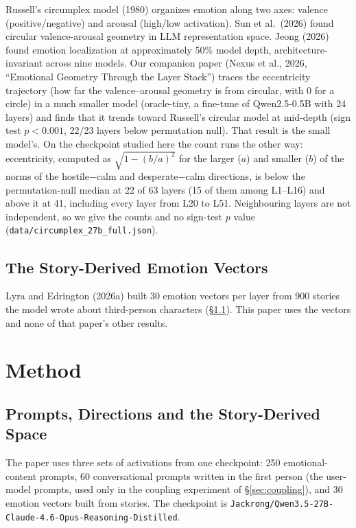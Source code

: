 \documentclass[11pt,a4paper]{article}
\begin{document}
Russell's circumplex model (1980) organizes emotion along two axes: valence (positive/negative) and arousal (high/low activation). Sun et al.\ (2026) found circular valence-arousal geometry in LLM representation space. Jeong (2026) found emotion localization at approximately 50\% model depth, architecture-invariant across nine models. Our companion paper (Nexus et al., 2026, ``Emotional Geometry Through the Layer Stack'') traces the eccentricity trajectory (how far the valence--arousal geometry is from circular, with 0 for a circle) in a much smaller model (oracle-tiny, a fine-tune of Qwen2.5-0.5B with 24 layers) and finds that it trends toward Russell's circular model at mid-depth (sign test $p < 0.001$, 22/23 layers below permutation null). That result is the small model's. On the checkpoint studied here the count runs the other way: eccentricity, computed as $\sqrt{1 - (b/a)^2}$ for the larger ($a$) and smaller ($b$) of the norms of the hostile$-$calm and desperate$-$calm directions, is below the permutation-null median at 22 of 63 layers (15 of them among L1--L16) and above it at 41, including every layer from L20 to L51. Neighbouring layers are not independent, so we give the counts and no sign-test $p$ value (\texttt{data/\allowbreak circumplex\_27b\_full.json}).

\subsection{The Story-Derived Emotion Vectors}
\label{sec:user-model}

Lyra and Edrington (2026a) built 30 emotion vectors per layer from 900 stories the model wrote about third-person characters (\S\ref{sec:shared-subspace}). This paper uses the vectors and none of that paper's other results.

\section{Method}
\label{sec:method}

\subsection{Prompts, Directions and the Story-Derived Space}
\label{sec:shared-subspace}

{\sloppy The paper uses three sets of activations from one checkpoint: 250 emotional-content prompts, 60 conversational prompts written in the first person (the user-model prompts, used only in the coupling experiment of \S\ref{sec:coupling}), and 30 emotion vectors built from stories. The checkpoint is \texttt{Jackrong/\allowbreak Qwen3.5-27B-\allowbreak Claude-4.6-\allowbreak Opus-\allowbreak Reasoning-\allowbreak Distilled}.\par}
\end{document}
